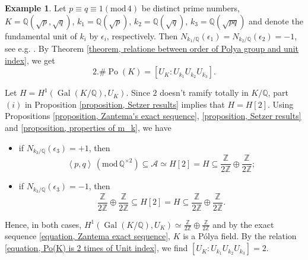 \documentclass{jams-l}
\theoremstyle{definition}
\newtheorem{example}[theorem]{Example}
\theoremstyle{remark}
\numberwithin{equation}{section}
\DeclareMathOperator{\Po}{Po}
\DeclareMathOperator{\Gal}{Gal}
\begin{document}

\begin{example}
	Let  $p \equiv q \equiv 1 (\mathrm{mod}\, 4)$ be distinct  prime numbers, $K=\mathbb{Q}(\sqrt{p},\sqrt{q})$,  $k_1=\mathbb{Q}(\sqrt{p})$, $k_2=\mathbb{Q}(\sqrt{q})$, $k_3=\mathbb{Q}(\sqrt{pq})$ and denote the fundamental unit of $k_i$ by $\epsilon_i$, respectively. Then $N_{k_1/\mathbb{Q}}(\epsilon_1)=N_{k_2/\mathbb{Q}}(\epsilon_2)=-1$, see e.g. \cite[Proposition 4]{Kis}. By Theorem \eqref{theorem, relatione between order of Polya group and unit index}, we get
	\begin{equation} \label{equation, Po(K) is 2 times of Unit index}
	2. \# \Po(K)= \left[U_K : U_{k_1} U_{k_2} U_{k_3}\right].
	\end{equation}

	
	Let $H=H^1(\Gal(K/\mathbb{Q}),U_K)$. Since $2$ doesn't ramify totally in $K/\mathbb{Q}$, part $(i)$ in Proposition \eqref{proposition, Setzer results} implies that $H=H[2]$. Using Propositions \ref{proposition, Zantema's exact sequence}, \ref{proposition, Setzer results} and \ref{proposition, properties of m_k}, we have
	\begin{itemize}
		\item[•] if $N_{k_3/\mathbb{Q}}(\epsilon_3)=+1$, then
		\begin{equation*}
			\left< p,q  \right> \, (\mathrm{mod}\, \mathbb{Q}^{\times 2})  \subseteq \mathcal{A} \simeq H[2] = H \subseteq \frac{\mathbb{Z}}{2\mathbb{Z}}\oplus \frac{\mathbb{Z}}{2\mathbb{Z}};
		\end{equation*}
		\item[•] if $N_{k_3/\mathbb{Q}}(\epsilon_3)=-1$, then
		\begin{equation*}
			\frac{\mathbb{Z}}{2\mathbb{Z}}\oplus \frac{\mathbb{Z}}{2\mathbb{Z}} \subseteq H[2] =H  \subseteq \frac{\mathbb{Z}}{2\mathbb{Z}}\oplus \frac{\mathbb{Z}}{2\mathbb{Z}}.
		\end{equation*}
	\end{itemize}
	
	Hence, in both cases, $ H^1(\Gal(K/\mathbb{Q}),U_K) \simeq \frac{\mathbb{Z}}{2\mathbb{Z}}\oplus \frac{\mathbb{Z}}{2\mathbb{Z}}$ and by  the exact sequence \eqref{equation, Zantema exact sequence}, $K$ is a P\'olya field. By the relation  \eqref{equation, Po(K) is 2 times of Unit index}, we find $\left[U_K : U_{k_1} U_{k_2} U_{k_3}\right]=2$.
\end{example}
\end{document}
